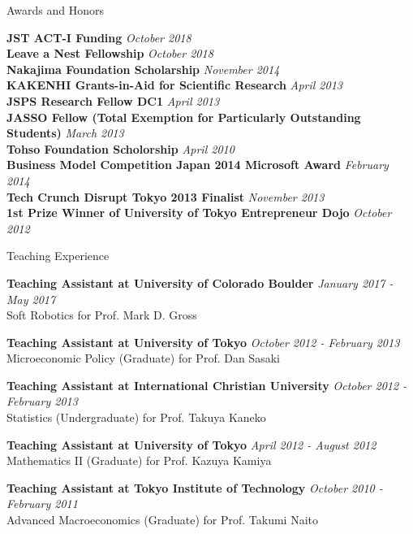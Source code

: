 \documentclass{resume} %
\begin{document}
\begin{rSection}{Awards and Honors}

{\bf JST ACT-I Funding} \hfill {\em October 2018} \\
{\bf Leave a Nest Fellowship} \hfill {\em October 2018} \\
{\bf Nakajima Foundation Scholarship} \hfill {\em November 2014} \\
{\bf KAKENHI Grants-in-Aid for Scientific Research} \hfill {\em April 2013} \\
{\bf JSPS Research Fellow DC1} \hfill {\em April 2013} \\
{\bf JASSO Fellow (Total Exemption for Particularly Outstanding Students) } \hfill {\em March 2013} \\
{\bf Tohso Foundation Scholorship} \hfill {\em April 2010} \\

{\bf Business Model Competition Japan 2014 Microsoft Award} \hfill {\em February 2014} \\
{\bf Tech Crunch Disrupt Tokyo 2013 Finalist} \hfill {\em November 2013} \\
{\bf 1st Prize Winner of University of Tokyo Entrepreneur Dojo} \hfill {\em October 2012} \\
\end{rSection}


\begin{rSection}{Teaching Experience}

{\bf Teaching Assistant at University of Colorado Boulder} \hfill {\em January 2017 - May 2017} \\
Soft Robotics for Prof. Mark D. Gross

{\bf Teaching Assistant at University of Tokyo} \hfill {\em October 2012 - February 2013} \\
Microeconomic Policy (Graduate) for Prof. Dan Sasaki

{\bf Teaching Assistant at International Christian University} \hfill {\em October 2012 - February 2013} \\
Statistics (Undergraduate) for Prof. Takuya Kaneko

{\bf Teaching Assistant at University of Tokyo} \hfill {\em April 2012 - August 2012} \\
Mathematics II (Graduate) for Prof. Kazuya Kamiya

{\bf Teaching Assistant at Tokyo Institute of Technology} \hfill {\em October 2010 - February 2011} \\
Advanced Macroeconomics (Graduate) for Prof. Takumi Naito

\end{rSection}
\end{document}
